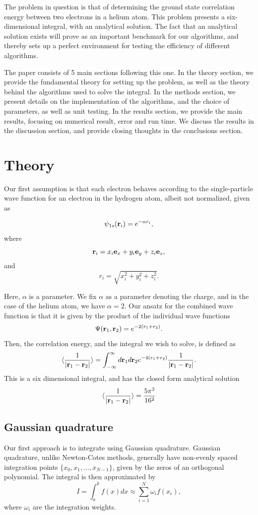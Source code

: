 \documentclass{emulateapj}
\begin{document}
The problem in question is that of determining the ground state correlation energy between two electrons in a helium atom. This problem presents a six-dimensional integral, with an analytical solution. The fact that an analytical solution exists will prove as an important benchmark for our algorithms, and thereby sets up a perfect environment for testing the efficiency of different algorithms.

The paper consists of 5 main sections following this one. In the theory section, we provide the fundamental theory for setting up the problem, as well as the theory behind the algorithms used to solve the integral. In the methods section, we present details on the implementation of the algorithms, and the choice of parameters, as well as unit testing. In the results section, we provide the main results, focusing on numerical result, error and run time. We discuss the results in the discussion section, and provide closing thoughts in the conclusions section.
\section{Theory}
\label{sec:method}
Our first assumption is that each electron behaves according to the single-particle wave function for an electron in the hydrogen atom, albeit not normalized, given as

\[
   \psi_{1s}({\bf r}_i)  =   e^{-\alpha r_i},
\]
where
\[
   {\bf r}_i =  x_i {\bf e}_x + y_i {\bf e}_y +z_i {\bf e}_z ,
\]
and
\[
r_i = \sqrt{x_i^2+y_i^2+z_i^2}.
\]

Here, $\alpha$ is a parameter. We fix $\alpha$ as a parameter denoting the charge, and in the case of the helium atom, we have $\alpha = 2$. Our ansatz for the combined wave function is that it is given by the product of the individual wave functions
\[
   \Psi({\bf r}_1,{\bf r}_2)  =   e^{-2 (r_1+r_2)}.
\]
Then, the correlation energy, and the integral we wish to solve, is defined as
\begin{equation}\label{eq:correlationenergy}
   \langle \frac{1}{|{\bf r}_1-{\bf r}_2|} \rangle =
   \int_{-\infty}^{\infty} d{\bf r}_1d{\bf r}_2  e^{-4 (r_1+r_2)}\frac{1}{|{\bf r}_1-{\bf r}_2|}.
\end{equation}
This is a six dimensional integral, and has the closed form analytical solution
\[
\langle \frac{1}{|{\bf r}_1-{\bf r}_2|} \rangle = \frac{5\pi^2}{16^2}
\]

\subsection{Gaussian quadrature}
Our first approach is to integrate using Gaussian quadrature. Gaussian quadrature, unlike Newton-Cotes methods, generally have non-evenly spaced integration points $\{x_0 , x_1 , \dots , x_{N-1}\}$, given by the zeros of an orthogonal polynomial. The integral is then approximated by
\begin{equation}
	I = \int_a^b f(x) dx \approx \sum^N_{i = 1} \omega_i f(x_i),
	\label{eq:quadrature}
\end{equation}
where $\omega_i$ are the integration weights.
\end{document}
